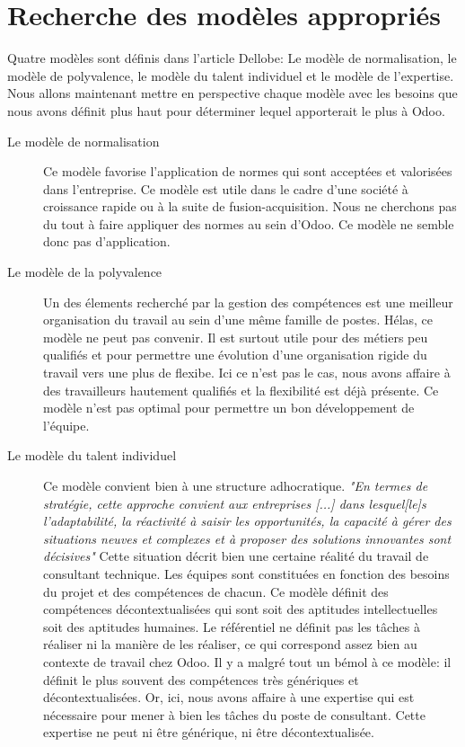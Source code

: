 \section{Recherche des modèles appropriés}
Quatre modèles sont définis dans l'article Dellobe\citep[pp.39-49]{delobbe}: Le modèle de normalisation, le modèle de polyvalence, le modèle du talent individuel et le modèle de l'expertise. Nous allons maintenant mettre en perspective chaque modèle avec les besoins que nous avons définit plus haut pour déterminer lequel apporterait le plus à Odoo.
\begin{description}
  \item[Le modèle de normalisation]
  Ce modèle favorise l'application de normes qui sont acceptées et valorisées dans l'entreprise. Ce modèle est utile dans le cadre d'une société à croissance rapide ou à la suite de fusion-acquisition. Nous ne cherchons pas du tout à faire appliquer des normes au sein d'Odoo. Ce modèle ne semble donc pas d'application. 
  \item[Le modèle de la polyvalence]
  Un des élements recherché par la gestion des compétences est une meilleur organisation du travail au sein d'une même famille de postes. Hélas, ce modèle ne peut pas convenir. Il est surtout utile pour des métiers peu qualifiés et pour permettre une évolution d'une organisation rigide du travail vers une plus de flexibe. Ici ce n'est pas le cas, nous avons affaire à des travailleurs hautement qualifiés et la flexibilité est déjà présente. Ce modèle n'est pas optimal pour permettre un bon développement de l'équipe. 
  \item[Le modèle du talent individuel]
  Ce modèle convient bien à une structure adhocratique. \textit{"En termes de stratégie, cette approche convient aux entreprises [...] dans lesquel[le]s l'adaptabilité, la réactivité à saisir les opportunités, la capacité à gérer des situations neuves et complexes et à proposer des solutions innovantes sont décisives"}\citep[pp.44]{delobbe} Cette situation décrit bien une certaine réalité du travail de consultant technique. Les équipes sont constituées en fonction des besoins du projet et des compétences de chacun. Ce modèle définit des compétences décontextualisées qui sont soit des aptitudes intellectuelles soit des aptitudes humaines. Le référentiel ne définit pas les tâches à réaliser ni la manière de les réaliser, ce qui correspond assez bien au contexte de travail chez Odoo. Il y a malgré tout un bémol à ce modèle: il définit le plus souvent des compétences très génériques et décontextualisées. Or, ici, nous avons affaire à une expertise qui est nécessaire pour mener à bien les tâches du poste de consultant. Cette expertise ne peut ni être générique, ni être décontextualisée. 

\end{description}
